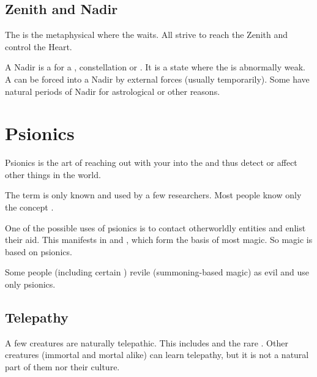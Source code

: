 \subsection{Zenith and Nadir}
The  is the metaphysical  where the  waits. 
All \matrices{} strive to reach the Zenith and control the Heart. 

A Nadir is a  for a \matrix{}, constellation or \vertex. 
It is a state where the \matrix{} is abnormally weak. 
A \matrix{} can be forced into a Nadir by external forces (usually temporarily). 
Some \matrices{} have natural periods of Nadir for astrological or other reasons. 















\section{Psionics}
Psionics is the art of reaching out with your  into the  and thus detect or affect other things in the world. 

The term  is only known and used by a few researchers. 
Most people know only the concept . 

One of the possible uses of psionics is to contact otherworldly entities and enlist their aid. 
This manifests in  and , which form the basis of most magic. 
So magic is based on psionics. 

Some people (including certain ) revile  (summoning-based magic) as evil and use only psionics. 









\subsection{Telepathy}
A few creatures are naturally telepathic. 
This includes  and the rare  \scathae. 
Other creatures (immortal and mortal alike) can learn telepathy, but it is not a natural part of them nor their culture. 

